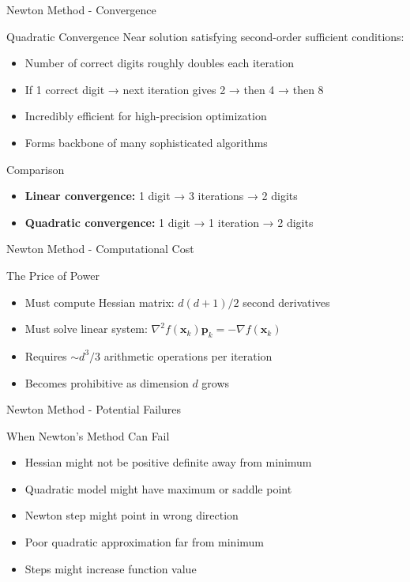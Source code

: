 \documentclass[aspectratio=1610]{beamer}
\begin{document}
\begin{frame}{Newton Method - Convergence}
  \begin{block}{Quadratic Convergence}
    Near solution satisfying second-order sufficient conditions:
    \begin{itemize}
      \item Number of correct digits roughly doubles each iteration
      \item If 1 correct digit → next iteration gives 2 → then 4 → then 8
      \item Incredibly efficient for high-precision optimization
      \item Forms backbone of many sophisticated algorithms
    \end{itemize}
  \end{block}
  
  \vspace{0.5cm}
  \begin{block}{Comparison}
    \begin{itemize}
      \item \textbf{Linear convergence:} 1 digit → 3 iterations → 2 digits
      \item \textbf{Quadratic convergence:} 1 digit → 1 iteration → 2 digits
    \end{itemize}
  \end{block}
\end{frame}

\begin{frame}{Newton Method - Computational Cost}
  \begin{block}{The Price of Power}
    \begin{itemize}
      \item Must compute Hessian matrix: $d(d+1)/2$ second derivatives
      \item Must solve linear system: $\nabla^2 f(\mathbf{x}_k)\mathbf{p}_k = -\nabla f(\mathbf{x}_k)$
      \item Requires $\sim d^3/3$ arithmetic operations per iteration
      \item Becomes prohibitive as dimension $d$ grows
    \end{itemize}
  \end{block}
\end{frame}

\begin{frame}{Newton Method - Potential Failures}
  \begin{block}{When Newton's Method Can Fail}
    \begin{itemize}
      \item Hessian might not be positive definite away from minimum
      \item Quadratic model might have maximum or saddle point
      \item Newton step might point in wrong direction
      \item Poor quadratic approximation far from minimum
      \item Steps might increase function value
    \end{itemize}
  \end{block}
\end{frame}
\end{document}
